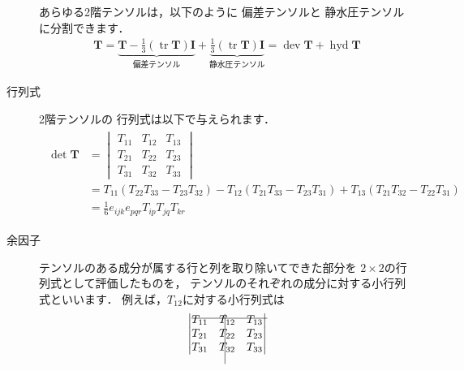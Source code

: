 \begin{description}
            あらゆる2階テンソルは，以下のように
%
偏差テンソルと
%
静水圧テンソルに分割できます．
            \begin{align}
             \label{eq:1.34}
             \bm{T} = \underbrace{\bm{T}
             - \frac{1}{3}(\mathop{\mathrm{tr}}\bm{T})\bm{I}}_{\text{偏差テンソル}}
             + \underbrace{\frac{1}{3}(\mathop{\mathrm{tr}}\bm{T})\bm{I}}_{\text{静水圧テンソル}}
             = \mathop{\mathrm{dev}}\bm{T} + \mathop{\mathrm{hyd}}\bm{T}
            \end{align}
 \item[行列式] 2階テンソルの
%
行列式は以下で与えられます．
            \begin{align}
             \label{eq:1.35}
             \begin{split}
              \det\bm{T} &= \begin{vmatrix}
                             T_{11} & T_{12} & T_{13} \\
                             T_{21} & T_{22} & T_{23} \\
                             T_{31} & T_{32} & T_{33}
                            \end{vmatrix} \\
              &= T_{11}(T_{22}T_{33} - T_{23}T_{32})
              - T_{12}(T_{21}T_{33} - T_{23}T_{31})
              + T_{13}(T_{21}T_{32} - T_{22}T_{31}) \\
              &= \frac{1}{6}e_{ijk}e_{pqr}T_{ip}T_{jq}T_{kr}
             \end{split}
            \end{align}
 \item[余因子] テンソルのある成分が属する行と列を取り除いてできた部分を
            $2 \times 2$の行列式として評価したものを，
            テンソルのそれぞれの成分に対する小行列式といいます．
            例えば，$T_{12}$に対する小行列式は
            \begin{align}
             \label{eq:1.36}
             \begin{vmatrix}
              \rlap{\rule[4pt]{67pt}{.4pt}}T_{11} &
              \rlap{\hskip5pt\smash{\rule[-36pt]{.4pt}{44pt}}}T_{12} & T_{13} \\
              T_{21} & T_{22} & T_{23} \\
              T_{31} & T_{32} & T_{33}
             \end{vmatrix}

\end{align}
\end{description}
